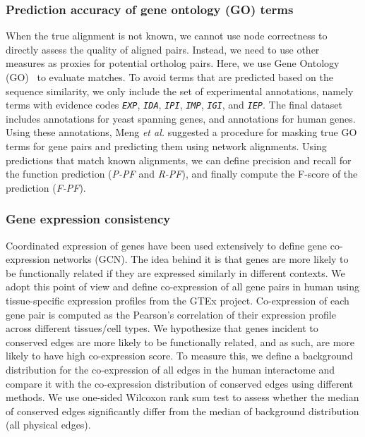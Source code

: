 \documentclass[10pt, journal, compsoc, final]{IEEEtran}
\begin{document}
\subsubsection{Prediction accuracy of gene ontology (GO) terms}

When the true alignment is not known, we cannot use node correctness to directly assess the 
quality of aligned pairs. Instead, we need to use other measures as proxies for potential ortholog 
pairs. Here, we use Gene Ontology (GO)~\cite{Ashburner2000} to evaluate matches. 
To avoid terms that are predicted based on the sequence similarity, we only include the set of experimental annotations, namely terms with evidence codes \texttt{\textit{EXP}}, \texttt{\textit{IDA}}, \texttt{\textit{IPI}}, \texttt{\textit{IMP}}, 
\texttt{\textit{IGI}}, and \texttt{\textit{IEP}}. The final dataset includes  annotations for yeast spanning  genes, and 
 annotations for  human genes. Using these annotations, Meng \textit{et al.} suggested a procedure for masking true GO terms for gene pairs and predicting them using network alignments. Using predictions that match known alignments, we can define precision and recall for the function prediction (\textit{P-PF} and \textit{R-PF}), and finally compute the F-score of the prediction (\textit{F-PF}).


\subsubsection{Gene expression consistency}
Coordinated expression of genes have been used extensively to define gene co-expression networks (GCN). The idea behind it is that genes are more likely to be functionally related if they are expressed similarly in different contexts. We adopt this point of view and define co-expression of all gene pairs in human using tissue-specific expression profiles from the GTEx project. Co-expression of each gene pair is computed as the Pearson's correlation of their expression profile across different tissues/cell types. We hypothesize that genes incident to conserved edges are more likely to be functionally related, and as such, are more likely to have high co-expression score. To measure this, we define a background distribution for the co-expression of all edges in the human interactome and compare it with the co-expression distribution of conserved edges using different methods. We use one-sided Wilcoxon rank sum test to assess whether the median of conserved edges significantly differ from the median of background distribution (all physical edges).
\end{document}
